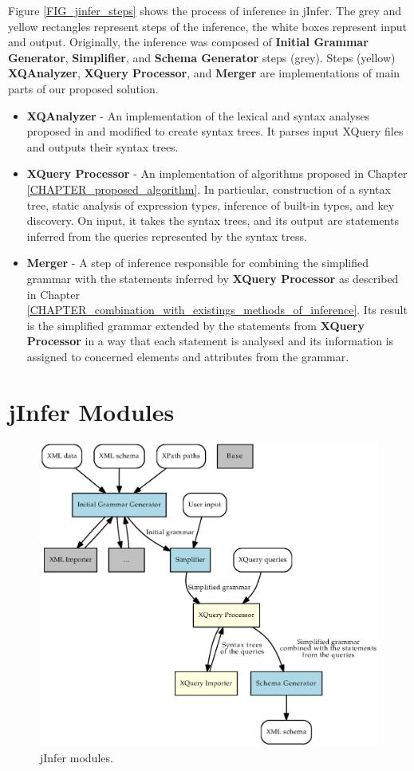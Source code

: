 Figure \ref{FIG_jinfer_steps} shows the process of inference in jInfer. The grey and yellow rectangles represent steps of the inference, the white boxes represent input and output. Originally, the inference was composed of \textbf{Initial Grammar Generator}, \textbf{Simplifier}, and \textbf{Schema Generator} steps (grey). Steps (yellow) \textbf{XQAnalyzer}, \textbf{XQuery Processor}, and \textbf{Merger} are implementations of main parts of our proposed solution.

\begin{itemize}
\item \textbf{XQAnalyzer} - An implementation of the lexical and syntax analyses proposed in \cite{thesis_schejbal} and modified to create syntax trees. It parses input XQuery files and outputs their syntax trees.
\item \textbf{XQuery Processor} - An implementation of algorithms proposed in Chapter \ref{CHAPTER_proposed_algorithm}. In particular, construction of a syntax tree, static analysis of expression types, inference of built-in types, and key discovery. On input, it takes the syntax trees, and its output are statements inferred from the queries represented by the syntax tress. 
\item \textbf{Merger} - A step of inference responsible for combining the simplified grammar with the statements inferred by \textbf{XQuery Processor} as described in Chapter \ref{CHAPTER_combination_with_existings_methods_of_inference}. Its result is the simplified grammar extended by the statements from \textbf{XQuery Processor} in a way that each statement is analysed and its information is assigned to concerned elements and attributes from the grammar. 
\end{itemize}

\section{jInfer Modules}
\begin{figure}
\label{FIG_jinfer_modules}
\caption{jInfer modules.}
\includegraphics[scale=0.8]{jinfer_modules.eps}
\end{figure}

